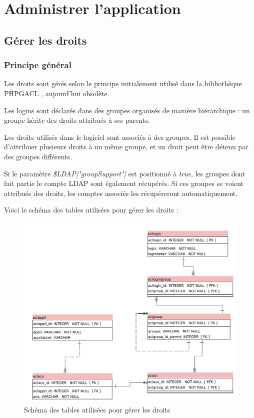 \chapter{Administrer l'application}

\section{Gérer les droits}
\label{droits}

\subsection{Principe général}

Les droits sont gérés selon le principe initialement utilisé dans la bibliothèque PHPGACL \cite{phpgacl}, aujourd'hui obsolète. 

Les logins sont déclarés dans des groupes organisés de manière hiérarchique : un groupe hérite des droits attribués à ses parents.

Les droits utilisés dans le logiciel sont associés à des groupes. Il est possible d'attribuer plusieurs droits à un même groupe, et un droit peut être détenu par des groupes différents.

Si le paramètre \textit{\$LDAP["groupSupport"]} est positionné à \textit{true}, les groupes dont fait partie le compte LDAP sont également récupérés. Si ces groupes se voient attribués des droits, les comptes associés les récupéreront automatiquement.

Voici le schéma des tables utilisées pour gérer les droits :

\begin{figure}[H]
\includegraphics[width=\linewidth]{images/acl_only}
\caption{Schéma des tables utilisées pour gérer les droits}
\end{figure}

